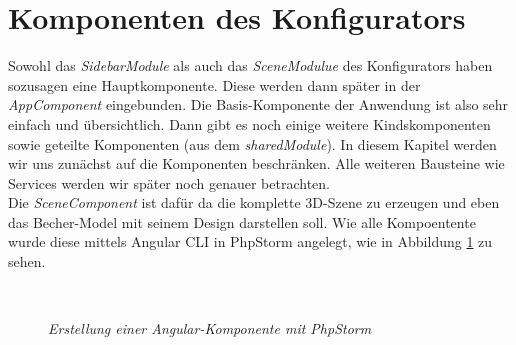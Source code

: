 \section{Komponenten des Konfigurators}
\label{sec:umsetzung}
%
Sowohl das \textit{SidebarModule} als auch das \textit{SceneModulue} des Konfigurators haben sozusagen eine \glqq Hauptkomponente\grqq. Diese werden dann später in der \textit{AppComponent} eingebunden. Die Basis-Komponente der Anwendung ist also sehr einfach und übersichtlich. Dann gibt es noch einige weitere Kindskomponenten sowie geteilte Komponenten (aus dem \textit{sharedModule}). In diesem Kapitel werden wir uns zunächst auf die Komponenten beschränken. Alle weiteren Bausteine wie Services werden wir später noch genauer betrachten.\\
Die \textit{SceneComponent} ist dafür da die komplette 3D-Szene zu erzeugen und eben das Becher-Model mit seinem Design darstellen soll. Wie alle Kompoentente wurde diese mittels Angular CLI in PhpStorm angelegt, wie in Abbildung \ref{fig:phpstorm} zu sehen. 
%
\begin{figure}[h]
	\centering
	\\
	\caption{\textit{Erstellung einer Angular-Komponente mit PhpStorm}}
	\label{fig:phpstorm}
\end{figure}
